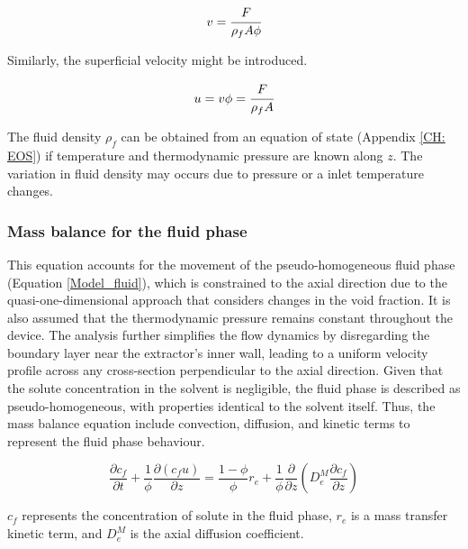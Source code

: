 \documentclass[../Article_Model_Parameters.tex]{subfiles}
\begin{document}
	{\footnotesize
	\begin{equation}
		v = \cfrac{F}{\rho_f A\phi} 
	\end{equation}
	}
	
	Similarly, the superficial velocity might be introduced.
	
	{\footnotesize
		\begin{equation}
			u = v \phi = \cfrac{F}{\rho_f A }
		\end{equation}
	}
	
	The fluid density $\rho_f$ can be obtained from an equation of state (Appendix \ref{CH: EOS}) if temperature and thermodynamic pressure are known along $z$. The variation in fluid density may occurs due to pressure or a inlet temperature changes. 
		
	\subsubsection{Mass balance for the fluid phase} \label{CH: Mass_balance_fluid}
	
	This equation accounts for the movement of the pseudo-homogeneous fluid phase (Equation \ref{Model_fluid}), which is constrained to the axial direction due to the quasi-one-dimensional approach that considers changes in the void fraction. It is also assumed that the thermodynamic pressure remains constant throughout the device. The analysis further simplifies the flow dynamics by disregarding the boundary layer near the extractor's inner wall, leading to a uniform velocity profile across any cross-section perpendicular to the axial direction. Given that the solute concentration in the solvent is negligible, the fluid phase is described as pseudo-homogeneous, with properties identical to the solvent itself. Thus, the mass balance equation include convection, diffusion, and kinetic terms to represent the fluid phase behaviour.
	
	{\footnotesize
		\begin{equation}
			\label{Model_fluid}
			\frac{\partial c_f}{\partial t}
			+ \frac{1}{\phi} \frac{\partial \left( c_f u\right)}{\partial z}
			= \frac{1-\phi}{\phi} r_e
			+ \frac{1}{\phi} \frac{\partial}{\partial z} \left( D^M_e \frac{\partial c_f}{\partial z} \right)
		\end{equation}
	}
	
	$c_f$ represents the concentration of solute in the fluid phase, $r_e$ is a mass transfer kinetic term, and $D^M_e$ is the axial diffusion coefficient.
	
\end{document}
